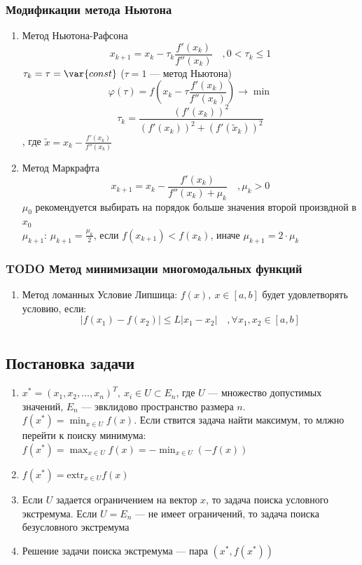 \documentclass[oneside]{book}
\newcommand{\const}{\var{const}}
\theoremstyle{plain}
\theoremstyle{remark}
\theoremstyle{definition}
\begin{document}
\subsection{Модификации метода Ньютона}
\label{sec:org7865663}
\begin{enumerate}
\item Метод Ньютона-Рафсона
\label{sec:orgfb28c1a}
\[ x_{k + 1} = x_k - \tau_k\frac{f'(x_k)}{f''(x_k)}\quad, 0 < \tau_k \le 1 \]
\(\tau_k = \tau = \const\) (\(\tau = 1\) --- метод Ньютона)
\[ \varphi(\tau) = f(x_k - \tau\frac{f'(x_k)}{f''(x_k)}) \to \min \]
\[ \tau_k = \frac{(f'(x_k))^2}{(f'(x_k))^2 + (f'(\tilde{x}_k))^2} \]
, где \(\tilde{x} = x_k - \frac{f'(x_k)}{f''(x_k)}\)
\item Метод Маркрафта
\label{sec:org042b129}
\[ x_{k + 1} = x_k - \frac{f'(x_k)}{f''(x_k) + \mu_k}\quad,\mu_k > 0 \]
\(\mu_0\) рекомендуется выбирать на порядок больше значения второй произвдной в \(x_0\) \\
\(\mu_{k + 1}\): \(\mu_{k + 1} = \frac{\mu_k}{2}\), если \(f(x_{k + 1}) < f(x_k)\), иначе \(\mu_{k + 1} = 2\cdot\mu_k\)
\end{enumerate}
\subsection{{\bfseries\sffamily TODO} Метод минимизации многомодальных функций}
\label{sec:org6f2b6fc}
\begin{enumerate}
\item Метод ломанных
\label{sec:orgd67e608}
Условие Липшица: \(f(x),\ x\in [a, b]\) будет удовлетворять условию, если:
\[ |f(x_1) - f(x_2)| \le L|x_1 - x_2|\quad,\forall x_1, x_2 \in [a, b] \]
\end{enumerate}
\chapter{}
\label{sec:org4032b13}
\section{Постановка задачи}
\label{sec:orgc393c58}
\begin{enumerate}
\item \(x^* = (x_1, x_2, \dots, x_n)^T,\ x_i \in U \subset E_n\), где \(U\) --- множество допустимых значений, \(E_n\) --- эвклидово
пространство размера \(n\). \(f(x^*) = \min_{x \in U} f(x)\). Если
ствится задача найти максимум, то млжно перейти к поиску минимума: \(f(x^*) = \max_{x\in U}f(x) = -\min_{x \in U}(-f(x))\)
\item \(f(x^*) = \text{extr}_{x \in U}f(x)\)
\item Если \(U\) задается ограничением на вектор \(x\), то задача поиска
условного экстремума. Если \(U = E_n\) --- не имеет ограничений,
то задача поиска безусловного экстремума
\item Решение задачи поиска экстремума --- пара \((x^*, f(x^*))\)
\end{enumerate}
\end{document}
